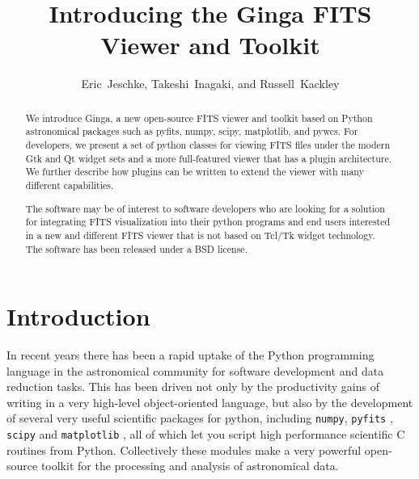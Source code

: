 
\resetcounters




\title{Introducing the Ginga FITS Viewer and Toolkit}
\author{Eric~Jeschke, Takeshi~Inagaki, and Russell~Kackley
}


\begin{abstract}
We introduce Ginga, a new open-source FITS
viewer and toolkit based on Python astronomical packages such as pyfits, numpy, scipy, matplotlib, and pywcs.  For developers, we present a set of python classes for viewing FITS files under the modern Gtk and Qt widget sets and a more  full-featured viewer that has a plugin architecture. We further describe how plugins can be written to extend the viewer with many different capabilities.  

The software may be of interest to software developers who are looking for a solution for integrating FITS visualization into their python programs and end users interested in a new and different FITS viewer that is not based on Tcl/Tk widget technology.  The software has been released under a BSD license.
\end{abstract}

\section{Introduction}
In recent years there has been a rapid uptake of the Python programming language in the astronomical community for software development and data reduction tasks. This has been driven not only by the productivity gains of writing in a very high-level object-oriented language, but also by the development of several very useful scientific packages for python, including  {\tt numpy}, {\tt pyfits} \citep{Barrett99}, {\tt scipy} and {\tt matplotlib} \citep{matplotlib}, all of which let you script high performance scientific C routines from Python. Collectively these modules make a very powerful open-source toolkit for the processing and analysis of astronomical data.

